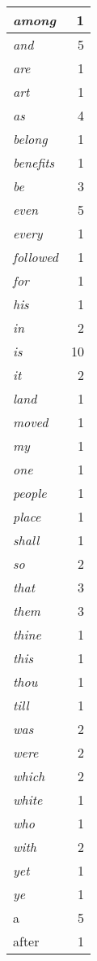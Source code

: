 \begin{center}
\begin{longtable}{l|r}
\emph{among} & 1 \\ \hline
\emph{and} & 5 \\ \hline
\emph{are} & 1 \\ \hline
\emph{art} & 1 \\ \hline
\emph{as} & 4 \\ \hline
\emph{belong} & 1 \\ \hline
\emph{benefits} & 1 \\ \hline
\emph{be} & 3 \\ \hline
\emph{even} & 5 \\ \hline
\emph{every} & 1 \\ \hline
\emph{followed} & 1 \\ \hline
\emph{for} & 1 \\ \hline
\emph{his} & 1 \\ \hline
\emph{in} & 2 \\ \hline
\emph{is} & 10 \\ \hline
\emph{it} & 2 \\ \hline
\emph{land} & 1 \\ \hline
\emph{moved} & 1 \\ \hline
\emph{my} & 1 \\ \hline
\emph{one} & 1 \\ \hline
\emph{people} & 1 \\ \hline
\emph{place} & 1 \\ \hline
\emph{shall} & 1 \\ \hline
\emph{so} & 2 \\ \hline
\emph{that} & 3 \\ \hline
\emph{them} & 3 \\ \hline
\emph{thine} & 1 \\ \hline
\emph{this} & 1 \\ \hline
\emph{thou} & 1 \\ \hline
\emph{till} & 1 \\ \hline
\emph{was} & 2 \\ \hline
\emph{were} & 2 \\ \hline
\emph{which} & 2 \\ \hline
\emph{white} & 1 \\ \hline
\emph{who} & 1 \\ \hline
\emph{with} & 2 \\ \hline
\emph{yet} & 1 \\ \hline
\emph{ye} & 1 \\ \hline
a & 5 \\ \hline
after & 1 \\ \hline

\end{longtable}
\end{center}
